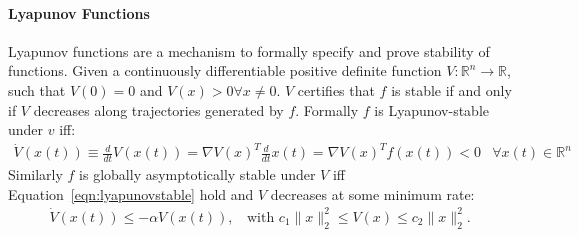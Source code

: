 \documentclass[11pt]{article}
\begin{document}
\paragraph{Lyapunov Functions }
Lyapunov functions \citep{khalil2002nonlinear,la2012stability} are a mechanism to formally specify and prove stability of functions. Given a continuously differentiable positive definite function $V : \mathbb{R}^n \rightarrow \mathbb{R}$, such that $V(0) = 0$ and $V(x) > 0 \forall x \neq 0$. $V$ certifies that $f$ is stable if and only if $V$ decreases along trajectories generated by $f$. Formally $f$ is Lyapunov-stable under $v$ iff:
\begin{align}
    \dot{V}(x(t)) \equiv \frac{d}{dt}V(x(t)) = \nabla V(x)^T \frac{d}{dt} x(t) = \nabla V(x)^T f(x(t)) < 0 & \forall x(t) \in \mathbb{R}^n \label{eqn:lyapunovstable}
\end{align}
Similarly $f$ is globally asymptotically stable under $V$ iff Equation~\ref{eqn:lyapunovstable} hold and $V$ decreases at some minimum rate:
\begin{align}
    \dot{V}(x(t)) \leq -\alpha V(x(t)), \;\; \mbox{ with } c_1 \|x\|_2^2 \leq V(x) \leq c_2 \|x\|_2^2. \label{eqn:req_for_GAS}
\end{align}
\end{document}
